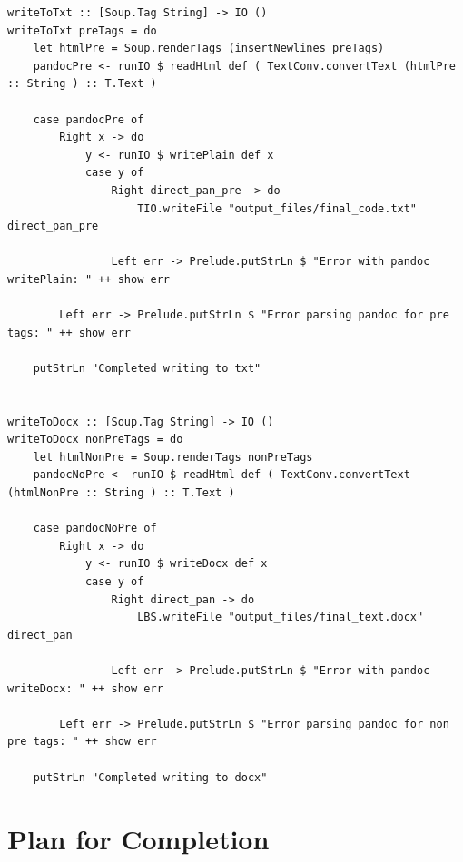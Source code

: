 \documentclass{scrreprt}
\begin{document}
\begin{verbatim}
writeToTxt :: [Soup.Tag String] -> IO ()
writeToTxt preTags = do
    let htmlPre = Soup.renderTags (insertNewlines preTags)
    pandocPre <- runIO $ readHtml def ( TextConv.convertText (htmlPre :: String ) :: T.Text )

    case pandocPre of
        Right x -> do
            y <- runIO $ writePlain def x
            case y of
                Right direct_pan_pre -> do
                    TIO.writeFile "output_files/final_code.txt" direct_pan_pre

                Left err -> Prelude.putStrLn $ "Error with pandoc writePlain: " ++ show err

        Left err -> Prelude.putStrLn $ "Error parsing pandoc for pre tags: " ++ show err
    
    putStrLn "Completed writing to txt"


writeToDocx :: [Soup.Tag String] -> IO ()
writeToDocx nonPreTags = do
    let htmlNonPre = Soup.renderTags nonPreTags
    pandocNoPre <- runIO $ readHtml def ( TextConv.convertText (htmlNonPre :: String ) :: T.Text )

    case pandocNoPre of
        Right x -> do
            y <- runIO $ writeDocx def x
            case y of
                Right direct_pan -> do
                    LBS.writeFile "output_files/final_text.docx" direct_pan

                Left err -> Prelude.putStrLn $ "Error with pandoc writeDocx: " ++ show err

        Left err -> Prelude.putStrLn $ "Error parsing pandoc for non pre tags: " ++ show err

    putStrLn "Completed writing to docx"

\end{verbatim}












\chapter{Plan for Completion}
\end{document}
